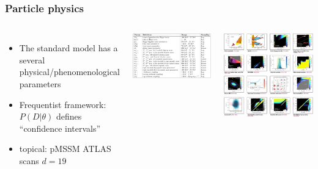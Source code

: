 \documentclass[aspectratio=169]{beamer}
\begin{document}
\begin{frame}
    \frametitle{Particle physics}
    \begin{columns}
        \begin{itemize}
            \item The standard model has a several physical/phenomenological parameters
            \item Frequentist framework: $P(D|\theta)$ defines ``confidence intervals''
            \item topical: pMSSM ATLAS scans $d=19$
        \end{itemize}
        \centerline{
            \includegraphics[width=\textwidth]{figures/pmssm}
        }
        \includegraphics[width=\textwidth]{figures/gambit_examples}
    \end{columns}
    
\end{frame}
\end{document}
